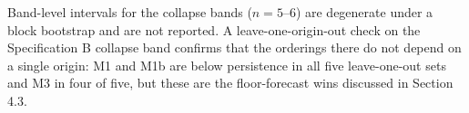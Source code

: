 Band-level intervals for the collapse bands ($n=5$--6) are degenerate under a block bootstrap and are not reported. A leave-one-origin-out check on the Specification B collapse band confirms that the orderings there do not depend on a single origin: M1 and M1b are below persistence in all five leave-one-out sets and M3 in four of five, but these are the floor-forecast wins discussed in Section 4.3.
